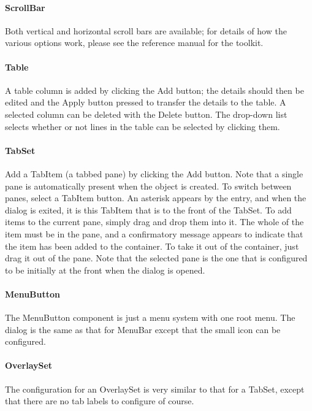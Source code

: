 \paragraph{ScrollBar}
Both vertical and horizontal scroll bars are available; for details of
how the various options work, please see the reference
manual for the toolkit.

\paragraph{Table}
A table column is added by clicking the Add button; the details should
then be edited and the Apply button pressed to transfer the details to
the table. A selected column can be deleted with the Delete button. The
drop-down list selects whether or not lines in the table can be
selected by clicking them.

\paragraph[TabSet]{TabSet}
Add a \textsf{TabItem} (a tabbed pane) by clicking the Add button. Note
that a single pane is automatically present when the object is created.
To switch between panes, select a \textsf{TabItem} button. An asterisk
appears by the entry, and when the dialog is exited, it is this
\textsf{TabItem} that is to the front of the \textsf{TabSet}. To add
items to the current pane, simply drag and drop them into it. The whole
of the item must be in the pane, and a confirmatory message appears to
indicate that the item has been added to the container. To take it out
of the container, just drag it out of the pane. Note that the selected
pane is the one that is configured to be initially at the front when
the dialog is opened.

\paragraph{MenuButton}
The \textsf{MenuButton} component is just a menu system with one root
menu. The dialog is the same as that for \textsf{MenuBar} except that
the small icon can be configured.

\paragraph{OverlaySet}
The configuration for an \textsf{OverlaySet} is very similar to that for
a \textsf{TabSet}, except that there are no tab labels to configure of
course.

